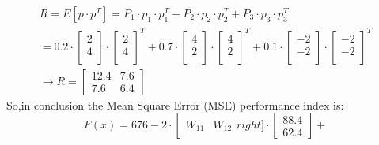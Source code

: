 \[
\begin{gathered}
	R = E[p \cdot p^T] = P_1 \cdot p_1 \cdot p_1^T + P_2 \cdot p_2 \cdot p_2^T + P_3 \cdot p_3 \cdot p_3^T \\ = 0.2 \cdot \left[
	\begin{array}{c}  
		2 \\  
		4 \\
	\end{array}
	\right] \cdot \left[
	\begin{array}{c}  
		2 \\  
		4 \\
	\end{array}
	\right]^T +  0.7 \cdot \left[
	\begin{array}{c}  
		4 \\  
		2 \\
	\end{array}
	\right] \cdot \left[
	\begin{array}{c}  
		4 \\  
		2 \\
	\end{array}
	\right]^T +  0.1 \cdot \left[
	\begin{array}{c}  
		-2 \\  
		-2 \\
	\end{array}
	\right] \cdot \left[
	\begin{array}{c}  
		-2 \\  
		-2 \\
	\end{array}
	\right]^T \\
	\rightarrow R = \left[
	\begin{array}{cc}
		12.4 & 7.6 \\
		7.6 & 6.4
	\end{array}
	\right]	
\end{gathered}
\]
So,in conclusion the Mean Square Error (MSE) performance index is:
\[
F(x) = 676 - 2 \cdot \left[ \begin{array}{cc}
	W_11 & W_12
\end{array}
right] \cdot \left[\begin{array}{c}
	88.4 \\
	62.4
\end{array}
\right] +
\]




	

